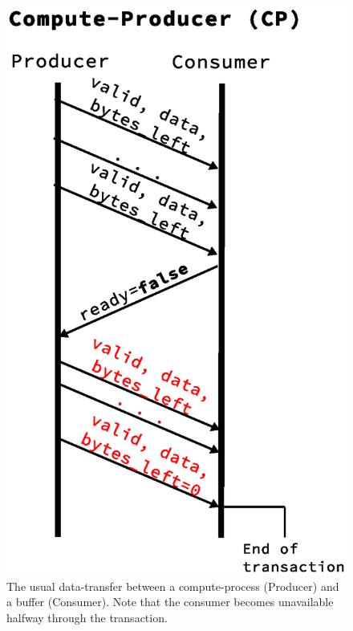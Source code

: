 \begin{figure}
	\centering
	\includegraphics[scale=0.5]{implementation/compute_producer.eps}
	\caption{The usual data-transfer between a compute-process (Producer) and a
	buffer (Consumer). Note that the consumer becomes unavailable halfway through the
	transaction.}
	\label{fig:compute_producer}
\end{figure}



